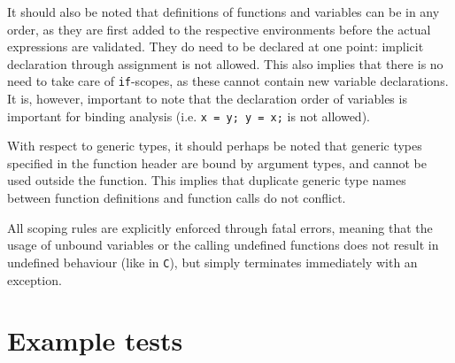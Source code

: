 \documentclass[a4paper]{article}
\begin{document}
It should also be noted that definitions of functions and variables can be in any order, as they are first added to the respective environments before the actual expressions are validated. They do need to be declared at one point: implicit declaration through assignment is not allowed. This also implies that there is no need to take care of {\tt if}-scopes, as these cannot contain new variable declarations. It is, however, important to note that the declaration order of variables is important for binding analysis (i.e. {\tt x = y; y = x;} is not allowed).

With respect to generic types, it should perhaps be noted that generic types specified in the function header are bound by argument types, and cannot be used outside the function. This implies that duplicate generic type names between function definitions and function calls do not conflict.

All scoping rules are explicitly enforced through fatal errors, meaning that the usage of unbound variables or the calling undefined functions does not result in undefined behaviour (like in {\tt C}), but simply terminates immediately with an exception.

\newpage %
\section{Example tests}
\label{examples}
\end{document}
